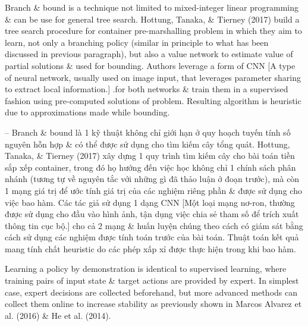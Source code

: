 \documentclass{article}
\begin{document}
\begin{itemize}
\begin{itemize}
\begin{itemize}
            Branch \& bound is a technique not limited to mixed-integer linear programming \& can be use for general tree search. Hottung, Tanaka, \& Tierney (2017) build a tree search procedure for container pre-marshalling problem in which they aim to learn, not only a branching policy (similar in principle to what has been discussed in previous paragraph), but also a value network to estimate value of partial solutions \& used for bounding. Authors leverage a form of CNN [A type of neural network, usually used on image input, that leverages parameter sharing to extract local information.] .for both networks \& train them in a supervised fashion using pre-computed solutions of problem. Resulting algorithm is heuristic due to approximations made while bounding.

            -- Branch \& bound là 1 kỹ thuật không chỉ giới hạn ở quy hoạch tuyến tính số nguyên hỗn hợp \& có thể được sử dụng cho tìm kiếm cây tổng quát. Hottung, Tanaka, \& Tierney (2017) xây dựng 1 quy trình tìm kiếm cây cho bài toán tiền sắp xếp container, trong đó họ hướng đến việc học không chỉ 1 chính sách phân nhánh (tương tự về nguyên tắc với những gì đã thảo luận ở đoạn trước), mà còn 1 mạng giá trị để ước tính giá trị của các nghiệm riêng phần \& được sử dụng cho việc bao hàm. Các tác giả sử dụng 1 dạng CNN [Một loại mạng nơ-ron, thường được sử dụng cho đầu vào hình ảnh, tận dụng việc chia sẻ tham số để trích xuất thông tin cục bộ.] cho cả 2 mạng \& huấn luyện chúng theo cách có giám sát bằng cách sử dụng các nghiệm được tính toán trước của bài toán. Thuật toán kết quả mang tính chất heuristic do các phép xấp xỉ được thực hiện trong khi bao hàm.

            Learning a policy by demonstration is identical to supervised learning, where training pairs of input state \& target actions are provided by expert. In simplest case, expert decisions are collected beforehand, but more advanced methods can collect them online to increase stability as previously shown in Marcos Alvarez et al. (2016) \& He et al. (2014).


\end{itemize}
\end{itemize}
\end{itemize}
\end{document}
